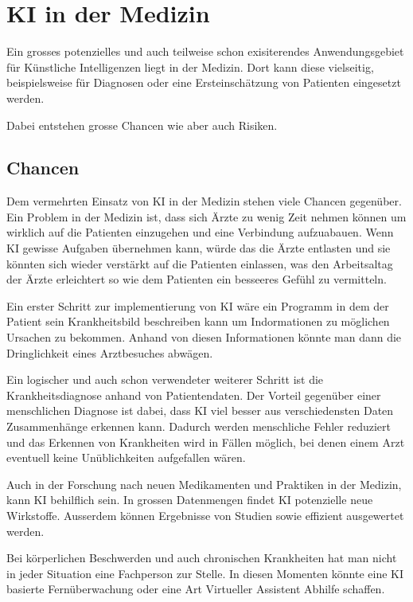 \chapter{KI in der Medizin}
\label{chap:ai-medicine}

Ein grosses potenzielles und auch teilweise schon exisiterendes Anwendungsgebiet für Künstliche Intelligenzen liegt in der Medizin.
Dort kann diese vielseitig, beispielsweise für Diagnosen oder eine Ersteinschätzung von Patienten eingesetzt werden.

Dabei entstehen grosse Chancen wie aber auch Risiken.

\section{Chancen}
Dem vermehrten Einsatz von KI in der Medizin stehen viele Chancen gegenüber.
Ein Problem in der Medizin ist, dass sich Ärzte zu wenig Zeit nehmen können um wirklich auf die Patienten einzugehen und eine Verbindung aufzuabauen.
Wenn KI gewisse Aufgaben übernehmen kann, würde das die Ärzte entlasten und sie könnten sich wieder verstärkt auf die Patienten einlassen, was den Arbeitsaltag der Ärzte erleichtert so wie dem Patienten ein besseeres Gefühl zu vermitteln.

Ein erster Schritt zur implementierung von KI wäre ein Programm in dem der Patient sein Krankheitsbild beschreiben kann um Indormationen zu möglichen Ursachen zu bekommen. Anhand von diesen Informationen könnte man dann die Dringlichkeit eines Arztbesuches abwägen.

Ein logischer und auch schon verwendeter weiterer Schritt ist die Krankheitsdiagnose anhand von Patientendaten. 
Der Vorteil gegenüber einer menschlichen Diagnose ist dabei, dass KI viel besser aus verschiedensten Daten Zusammenhänge erkennen kann. 
Dadurch werden menschliche Fehler reduziert und das Erkennen von Krankheiten wird in Fällen möglich, bei denen einem Arzt eventuell keine Unüblichkeiten aufgefallen wären.

Auch in der Forschung nach neuen Medikamenten und Praktiken in der Medizin, kann KI behilflich sein. In grossen Datenmengen findet KI potenzielle neue Wirkstoffe.
Ausserdem können Ergebnisse von Studien sowie effizient ausgewertet werden.

Bei körperlichen Beschwerden und auch chronischen Krankheiten hat man nicht in jeder Situation eine Fachperson zur Stelle. In diesen Momenten könnte eine KI basierte Fernüberwachung oder eine Art Virtueller Assistent Abhilfe schaffen.

